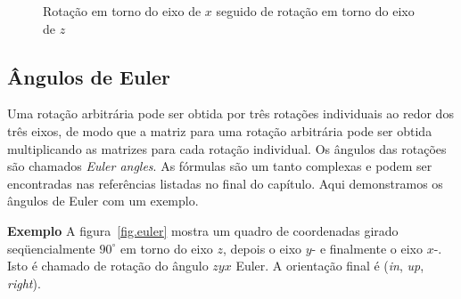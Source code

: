 \begin{figure}
\begin{center}
\hspace{2em}
\hspace{2em}
\caption{Rotação em torno do eixo de $x$ seguido de rotação em torno do eixo de $z$}\label{fig.non-commutative2}
\end{center}
\end{figure}

\subsection{Ângulos de Euler}

Uma rotação arbitrária pode ser obtida por três rotações individuais ao redor dos três eixos, de modo que a matriz para uma rotação arbitrária pode ser obtida multiplicando as matrizes para cada rotação individual. Os ângulos das rotações são chamados \emph{Euler angles}. As fórmulas são um tanto complexas e podem ser encontradas nas referências listadas no final do capítulo. Aqui demonstramos os ângulos de Euler com um exemplo.

\noindent\textbf{Exemplo} A figura~\ref{fig.euler} mostra um quadro de coordenadas girado seqüencialmente $90^\circ$ em torno do eixo $z$, depois o eixo $y$- e finalmente o eixo $x$-. Isto é chamado de rotação do ângulo $zyx$ Euler. A orientação final é (\textit{in}, \textit{up}, \textit{right}).

